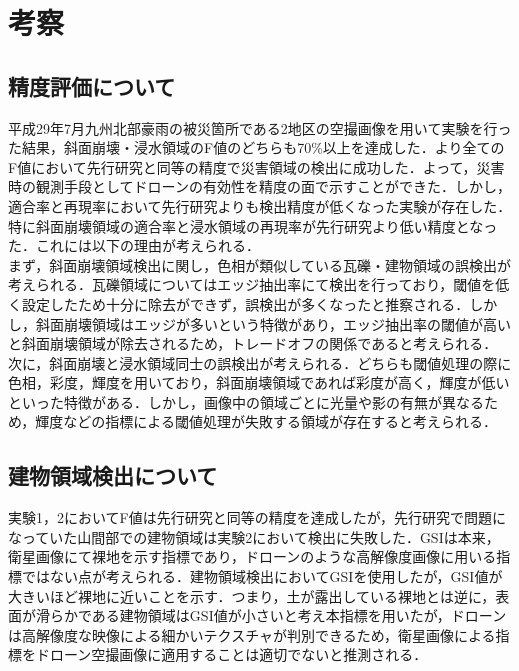 \documentclass[../Thesis]{subfiles}
\begin{document}
\section{考察}
\subsection{精度評価について}
平成29年7月九州北部豪雨の被災箇所である2地区の空撮画像を用いて実験を行った結果，斜面崩壊・浸水領域のF値のどちらも70\%以上を達成した．より全てのF値において先行研究と同等の精度で災害領域の検出に成功した．よって，災害時の観測手段としてドローンの有効性を精度の面で示すことができた．しかし，適合率と再現率において先行研究よりも検出精度が低くなった実験が存在した．特に斜面崩壊領域の適合率と浸水領域の再現率が先行研究より低い精度となった．これには以下の理由が考えられる． \\
\quad まず，斜面崩壊領域検出に関し，色相が類似している瓦礫・建物領域の誤検出が考えられる．瓦礫領域についてはエッジ抽出率にて検出を行っており，閾値を低く設定したため十分に除去ができず，誤検出が多くなったと推察される．しかし，斜面崩壊領域はエッジが多いという特徴があり，エッジ抽出率の閾値が高いと斜面崩壊領域が除去されるため，トレードオフの関係であると考えられる． \\
\quad 次に，斜面崩壊と浸水領域同士の誤検出が考えられる．どちらも閾値処理の際に色相，彩度，輝度を用いており，斜面崩壊領域であれば彩度が高く，輝度が低いといった特徴がある．しかし，画像中の領域ごとに光量や影の有無が異なるため，輝度などの指標による閾値処理が失敗する領域が存在すると考えられる． \\


\subsection{建物領域検出について}
実験1，2においてF値は先行研究と同等の精度を達成したが，先行研究で問題になっていた山間部での建物領域は実験2において検出に失敗した．GSIは本来，衛星画像にて裸地を示す指標であり，ドローンのような高解像度画像に用いる指標ではない点が考えられる．建物領域検出においてGSIを使用したが，GSI値が大きいほど裸地に近いことを示す．つまり，土が露出している裸地とは逆に，表面が滑らかである建物領域はGSI値が小さいと考え本指標を用いたが，ドローンは高解像度な映像による細かいテクスチャが判別できるため，衛星画像による指標をドローン空撮画像に適用することは適切でないと推測される． \\
\end{document}
